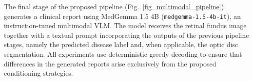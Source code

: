 \documentclass[runningheads]{llncs}
\begin{document}



The final stage of the proposed pipeline (Fig.~\ref{fig_multimodal_pipeline}) generates a clinical report using MedGemma 1.5 4B (\texttt{medgemma-1.5-4b-it}), an instruction-tuned multimodal \gls{VLM}. The model receives the retinal fundus image together with a textual prompt incorporating the outputs of the previous pipeline stages, namely the predicted disease label and, when applicable, the optic disc segmentation. All experiments use deterministic greedy decoding to ensure that differences in the generated reports arise exclusively from the proposed conditioning strategies.
\end{document}
